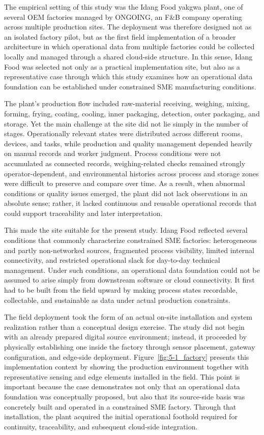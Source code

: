 \documentclass[systems,article,submit,pdftex,moreauthors]{Definitions/mdpi}
\begin{document}
The empirical setting of this study was the Idang Food yakgwa plant, one of several OEM factories managed by ONGOING, an F\&B company operating across multiple production sites. The deployment was therefore designed not as an isolated factory pilot, but as the first field implementation of a broader architecture in which operational data from multiple factories could be collected locally and managed through a shared cloud-side structure. In this sense, Idang Food was selected not only as a practical implementation site, but also as a representative case through which this study examines how an operational data foundation can be established under constrained SME manufacturing conditions.

The plant's production flow included raw-material receiving, weighing, mixing, forming, frying, coating, cooling, inner packaging, detection, outer packaging, and storage. Yet the main challenge at the site did not lie simply in the number of stages. Operationally relevant states were distributed across different rooms, devices, and tasks, while production and quality management depended heavily on manual records and worker judgment. Process conditions were not accumulated as connected records, weighing-related checks remained strongly operator-dependent, and environmental histories across process and storage zones were difficult to preserve and compare over time. As a result, when abnormal conditions or quality issues emerged, the plant did not lack observations in an absolute sense; rather, it lacked continuous and reusable operational records that could support traceability and later interpretation.

This made the site suitable for the present study. Idang Food reflected several conditions that commonly characterize constrained SME factories: heterogeneous and partly non-networked sources, fragmented process visibility, limited internal connectivity, and restricted operational slack for day-to-day technical management. Under such conditions, an operational data foundation could not be assumed to arise simply from downstream software or cloud connectivity. It first had to be built from the field upward by making process states recordable, collectable, and sustainable as data under actual production constraints.

The field deployment took the form of an actual on-site installation and system realization rather than a conceptual design exercise. The study did not begin with an already prepared digital source environment; instead, it proceeded by physically establishing one inside the factory through sensor placement, gateway configuration, and edge-side deployment. Figure~\ref{fig:5-1_factory} presents this implementation context by showing the production environment together with representative sensing and edge elements installed in the field. This point is important because the case demonstrates not only that an operational data foundation was conceptually proposed, but also that its source-side basis was concretely built and operated in a constrained SME factory. Through that installation, the plant acquired the initial operational foothold required for continuity, traceability, and subsequent cloud-side integration.
\end{document}
